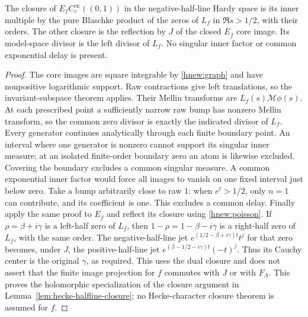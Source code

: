 \begin{lemma}\label{hnew:closure}
The closure of $E_fC_c^\infty((0,1))$ in the negative-half-line
Hardy space is its inner multiple by the pure Blaschke product
of the zeros of $L_f$ in $\Re s>1/2$, with their orders.
The other closure is the reflection by $J$ of the closed
$E_{\bar f}$ core image.  Its model-space divisor is the left
divisor of $L_f$.  No singular inner factor or common exponential
delay is present.
\end{lemma}
\begin{proof}
The core images are square integrable by \eqref{hnew:graph} and
have nonpositive logarithmic support.  Raw contractions give
left translations, so the invariant-subspace theorem applies.
Their Mellin transforms are $L_f(s)\mathcal M\phi(s)$.
At each prescribed point a sufficiently narrow raw bump has
nonzero Mellin transform, so the common zero divisor is exactly
the indicated divisor of $L_f$.
Every generator continues analytically through each finite
boundary point.  An interval where one generator is nonzero
cannot support its singular inner measure; at an isolated
finite-order boundary zero an atom is likewise excluded.
Covering the boundary excludes a common singular measure.
A common exponential inner factor would force all images to
vanish on one fixed interval just below zero.
Take a bump arbitrarily close to raw $1$: when $e^t>1/2$,
only $n=1$ can contribute, and its coefficient is one.
This excludes a common delay.
Finally apply the same proof to $E_{\bar f}$ and reflect its
closure using \eqref{hnew:poisson}.
If $\rho=\beta+i\gamma$ is a left-half zero of $L_f$,
then $1-\rho=1-\beta-i\gamma$ is a right-half zero of
$L_{\bar f}$, with the same order.
The negative-half-line jet
$e^{(1/2-\beta+i\gamma)t}t^j$ for that zero becomes, under $J$,
the positive-half-line jet $e^{(\beta-1/2-i\gamma)t}(-t)^j$.
Thus its Cauchy center is the original $\gamma$, as required.
This uses the dual closure and does not assert that the
finite image projection for $f$ commutes with $J$ or with
$F_\Lambda$.  This proves the holomorphic specialization
of the closure argument in Lemma~\ref{lem:hecke-halfline-closure};
no Hecke-character closure theorem is assumed for $f$.
\end{proof}

